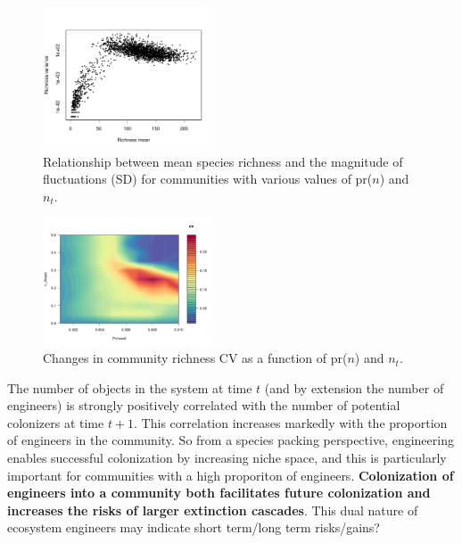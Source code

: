 \documentclass[twocolumn,preprintnumbers,amsmath,amssymb,superscriptaddress]{revtex4}
\begin{document}
\begin{figure}
\centering
\includegraphics[width=0.45\textwidth]{fig_taylors.pdf}
\caption{
Relationship between mean species richness and the magnitude of fluctuations (SD) for communities with various values of pr($n$) and $n_t$.
}
\label{fig_traj}
\end{figure} 


\begin{figure}
\centering
\includegraphics[width=0.45\textwidth]{fig_sen_nn.pdf}
\caption{Changes in community richness CV as a function of pr($n$) and $n_t$. 
}
\label{fig_sen_nn}
\end{figure} 




The number of objects in the system at time $t$ (and by extension the number of engineers) is strongly positively correlated with the number of potential colonizers at time $t+1$.
This correlation increases markedly with the proportion of engineers in the community.
So from a species packing perspective, engineering enables successful colonization by increasing niche space, and this is particularly important for communities with a high proporiton of engineers.
{\bf Colonization of engineers into a community both facilitates future colonization and increases the risks of larger extinction cascades}.
This dual nature of ecosystem engineers may indicate short term/long term risks/gains?
\end{document}

